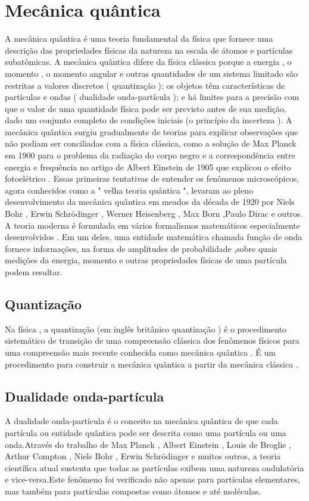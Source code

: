 \documentclass{report}
\begin{document}
\section{Mecânica quântica}
A mecânica quântica é uma teoria fundamental da física que fornece uma descrição das propriedades físicas da natureza na escala de átomos e partículas subatômicas.
\newline
A mecânica quântica difere da física clássica porque a energia , o momento , o momento angular e outras quantidades de um sistema limitado são restritas a valores discretos ( quantização ); os objetos têm características de partículas e ondas ( dualidade onda-partícula ); e há limites para a precisão com que o valor de uma quantidade física pode ser previsto antes de sua medição, dado um conjunto completo de condições iniciais (o princípio da incerteza ).
A mecânica quântica surgiu gradualmente de teorias para explicar observações que não podiam ser conciliadas com a física clássica, como a solução de Max Planck em 1900 para o problema da radiação do corpo negro e a correspondência entre energia e frequência no artigo de Albert Einstein de 1905 que explicou o efeito fotoelétrico . Essas primeiras tentativas de entender os fenômenos microscópicos, agora conhecidos como a " velha teoria quântica ", levaram ao pleno desenvolvimento da mecânica quântica em meados da década de 1920 por Niels Bohr , Erwin Schrödinger , Werner Heisenberg , Max Born ,Paulo Dirac e outros. A teoria moderna é formulada em vários formalismos matemáticos especialmente desenvolvidos . Em um deles, uma entidade matemática chamada função de onda fornece informações, na forma de amplitudes de probabilidade ,sobre quais medições da energia, momento e outras propriedades físicas de uma partícula podem resultar.
\subsection{Quantização}
Na física , a quantização (em inglês britânico quantização ) é o procedimento sistemático de transição de uma compreensão clássica dos fenômenos físicos para uma compreensão mais recente conhecida como mecânica quântica . É um procedimento para construir a mecânica quântica a partir da mecânica clássica .
\subsection{Dualidade onda-partícula}
A dualidade onda-partícula é o conceito na mecânica quântica de que cada partícula ou entidade quântica pode ser descrita como uma partícula ou uma onda.Através do trabalho de Max Planck , Albert Einstein , Louis de Broglie , Arthur Compton , Niels Bohr , Erwin Schrödinger e muitos outros, a teoria científica atual sustenta que todas as partículas exibem uma natureza ondulatória e vice-versa.Este fenômeno foi verificado não apenas para partículas elementares, mas também para partículas compostas como átomos e até moléculas. 
\end{document}
